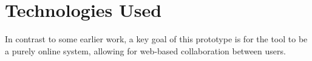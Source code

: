 \section{Technologies Used}
\label{sec:requirements:technologies-used}

In contrast to some earlier work, a key goal of this prototype is for the tool to be a purely online system, allowing for web-based collaboration between users.  



%
%
%
%
%

%

%

%

%
